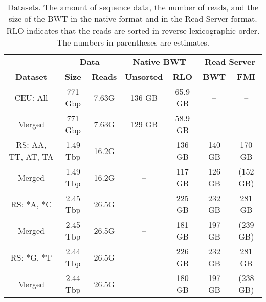 \documentclass[smallabstract,smallcaptions]{dccpaper}
\newcommand{\BWT}{\textsf{BWT}}
\newcommand{\FMI}{\textsf{FMI}}
\newcommand{\CEU}{\textsf{CEU}}
\newcommand{\RS}{\textsf{RS}}
\begin{document}
\begin{table}[t!]
\begin{center}
\caption{Datasets. The amount of sequence data, the number of reads, and the size of the \BWT{} in the native format and in the Read Server format. RLO indicates that the reads are sorted in reverse lexicographic order. The numbers in parentheses are estimates.}\label{table:datasets}\smallskip%
{
\renewcommand{\baselinestretch}{1}\footnotesize
\begin{tabular}{c|cc|cc|cc}
\hline
 & \multicolumn{2}{c|}{\textbf{Data}} & \multicolumn{2}{c|}{\textbf{Native \BWT}} &
 \multicolumn{2}{c}{\textbf{Read Server}} \\
\textbf{Dataset} & \textbf{Size} & \textbf{Reads} & \textbf{Unsorted} & \textbf{RLO} & \textbf{\BWT} & \textbf{\FMI} \\
\hline
\CEU: All           &  771 Gbp & 7.63G &  136 GB & 65.9 GB &      -- &       -- \\
Merged              &  771 Gbp & 7.63G &  129 GB & 58.9 GB &      -- &       -- \\
\hline
\RS: AA, TT, AT, TA & 1.49 Tbp & 16.2G &      -- &  136 GB &  140 GB &   170 GB \\
Merged              & 1.49 Tbp & 16.2G &      -- &  117 GB &  126 GB & (152 GB) \\
\hline
\RS: *A, *C         & 2.45 Tbp & 26.5G &      -- &  225 GB &  232 GB &   281 GB \\
Merged              & 2.45 Tbp & 26.5G &      -- &  181 GB &  197 GB & (239 GB) \\
\hline
\RS: *G, *T         & 2.44 Tbp & 26.5G &      -- &  226 GB &  232 GB &   281 GB \\
Merged              & 2.44 Tbp & 26.5G &      -- &  180 GB &  197 GB & (238 GB) \\
\hline
\end{tabular}}
\end{center}%
\vspace{-16pt}
\end{table}
\end{document}
